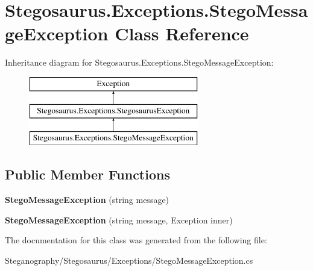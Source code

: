 \hypertarget{class_stegosaurus_1_1_exceptions_1_1_stego_message_exception}{}\section{Stegosaurus.\+Exceptions.\+Stego\+Message\+Exception Class Reference}
\label{class_stegosaurus_1_1_exceptions_1_1_stego_message_exception}
Inheritance diagram for Stegosaurus.\+Exceptions.\+Stego\+Message\+Exception\+:\begin{figure}[H]
\begin{center}
\leavevmode
\includegraphics[height=3.000000cm]{class_stegosaurus_1_1_exceptions_1_1_stego_message_exception}
\end{center}
\end{figure}
\subsection*{Public Member Functions}
\begin{DoxyCompactItemize}
\item 
{\bfseries Stego\+Message\+Exception} (string message)\hypertarget{class_stegosaurus_1_1_exceptions_1_1_stego_message_exception_aed93bec652d63a8fa965f58be455db21}{}\label{class_stegosaurus_1_1_exceptions_1_1_stego_message_exception_aed93bec652d63a8fa965f58be455db21}

\item 
{\bfseries Stego\+Message\+Exception} (string message, Exception inner)\hypertarget{class_stegosaurus_1_1_exceptions_1_1_stego_message_exception_a8019781064571ac1df7cedc477415571}{}\label{class_stegosaurus_1_1_exceptions_1_1_stego_message_exception_a8019781064571ac1df7cedc477415571}

\end{DoxyCompactItemize}


The documentation for this class was generated from the following file\+:\begin{DoxyCompactItemize}
\item 
Steganography/\+Stegosaurus/\+Exceptions/Stego\+Message\+Exception.\+cs\end{DoxyCompactItemize}
